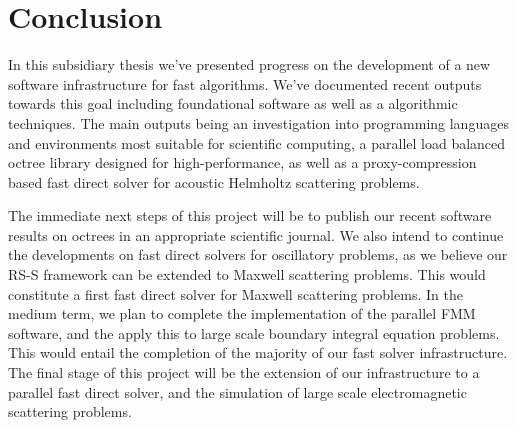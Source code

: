 \chapter{Conclusion}\label{chpt:conclusion}

In this subsidiary thesis we've presented progress on the development of a new software infrastructure for fast algorithms. We've documented recent outputs towards this goal including foundational software as well as a algorithmic techniques. The main outputs being an investigation into programming languages and environments most suitable for scientific computing, a parallel load balanced octree library designed for high-performance,  as well as a proxy-compression based fast direct solver for acoustic Helmholtz scattering problems.

The immediate next steps of this project will be to publish our recent software results on octrees in an appropriate scientific journal. We also intend to continue the developments on fast direct solvers for oscillatory problems, as we believe our RS-S framework can be extended to Maxwell scattering problems. This would constitute a first fast direct solver for Maxwell scattering problems. In the medium term, we plan to complete the implementation of the parallel FMM software, and the apply this to large scale boundary integral equation problems. This would entail the completion of the majority of our fast solver infrastructure. The final stage of this project will be the extension of our infrastructure to a parallel fast direct solver, and the simulation of large scale electromagnetic scattering problems.